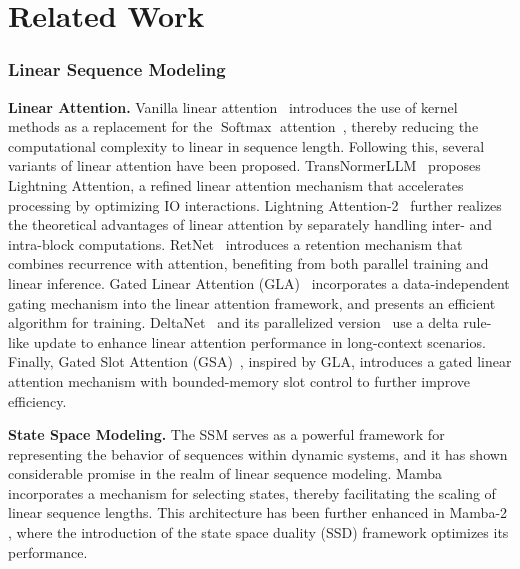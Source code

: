 \section{Related Work}
\subsubsection{Linear Sequence Modeling}

\textbf{Linear Attention.} Vanilla linear attention~\citep{katharopoulos2020transformers} introduces the use of kernel methods as a replacement for the $\operatorname{Softmax}$ attention~\citep{vaswani2017attention}, thereby reducing the computational complexity to linear in sequence length. Following this, several variants of linear attention have been proposed. TransNormerLLM~\citep{qin2023scaling,qin2023transnormerllm} proposes Lightning Attention, a refined linear attention mechanism that accelerates processing by optimizing IO interactions. Lightning Attention-2~\citep{qin2024lightning} further realizes the theoretical advantages of linear attention by separately handling inter- and intra-block computations. RetNet~\citep{sun2023retentive} introduces a retention mechanism that combines recurrence with attention, benefiting from both parallel training and linear inference. Gated Linear Attention (GLA)~\citep{yang2023gated} incorporates a data-independent gating mechanism into the linear attention framework, and presents an efficient algorithm for training. DeltaNet~\citep{Schlag2021LinearTA} and its parallelized version~\citep{yang2024parallelizing} use a delta rule-like update to enhance linear attention performance in long-context scenarios. Finally, Gated Slot Attention (GSA)~\citep{zhang2024gsa}, inspired by GLA, introduces a gated linear attention mechanism with bounded-memory slot control to further improve efficiency.

\textbf{State Space Modeling.} The SSM serves as a powerful framework for representing the behavior of sequences within dynamic systems, and it has shown considerable promise in the realm of linear sequence modeling. Mamba \citep{gu2023mamba} incorporates a mechanism for selecting states, thereby facilitating the scaling of linear sequence lengths. This architecture has been further enhanced in Mamba-2 \citep{dao2024transformers}, where the introduction of the state space duality (SSD) framework optimizes its performance.

